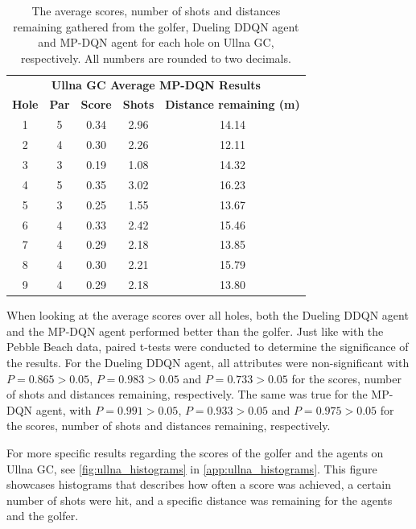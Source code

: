 \documentclass{kththesis}
\begin{document}
\begin{table}
    \begin{subtable}{\textwidth}
    \centering
    \begin{tabular}{c|c|c|c|c}
    \multicolumn{5}{c}{\textbf{Ullna GC Average MP-DQN Results}} \\
        \textbf{Hole} & \textbf{Par} & \textbf{Score} & \textbf{Shots} & \textbf{Distance remaining (m)}  \\ \hline
        1 & 5 & 0.34 & 2.96 & 14.14 \\ 
        2 & 4 & 0.30 & 2.26 & 12.11 \\ 
        3 & 3 & 0.19 & 1.08 & 14.32 \\ 
        4 & 5 & 0.35 & 3.02 & 16.23 \\ 
        5 & 3 & 0.25 & 1.55 & 13.67 \\ 
        6 & 4 & 0.33 & 2.42 & 15.46 \\ 
        7 & 4 & 0.29 & 2.18 & 13.85 \\ 
        8 & 4 & 0.30 & 2.21 & 15.79 \\ 
        9 & 4 & 0.29 & 2.18 & 13.80 \\ 
    \end{tabular}
    \end{subtable}
    \caption{The average scores, number of shots and distances remaining gathered from the golfer, Dueling DDQN agent and MP-DQN agent for each hole on Ullna GC, respectively. All numbers are rounded to two decimals.}
    \label{tab:ullna_average_results}
\end{table}

When looking at the average scores over all holes, both the Dueling DDQN agent and the MP-DQN agent performed better than the golfer. Just like with the Pebble Beach data, paired t-tests were conducted to determine the significance of the results. For the Dueling DDQN agent, all attributes were non-significant with $P = 0.865 > 0.05$, $P = 0.983 > 0.05$ and $P = 0.733 > 0.05$ for the scores, number of shots and distances remaining, respectively. The same was true for the MP-DQN agent, with $P = 0.991 > 0.05$, $P = 0.933 > 0.05$ and $P = 0.975 > 0.05$ for the scores, number of shots and distances remaining, respectively.

For more specific results regarding the scores of the golfer and the agents on Ullna GC, see \autoref{fig:ullna_histograms} in \autoref{app:ullna_histograms}. This figure showcases histograms that describes how often a score was achieved, a certain number of shots were hit, and a specific distance was remaining for the agents and the golfer.
\end{document}
